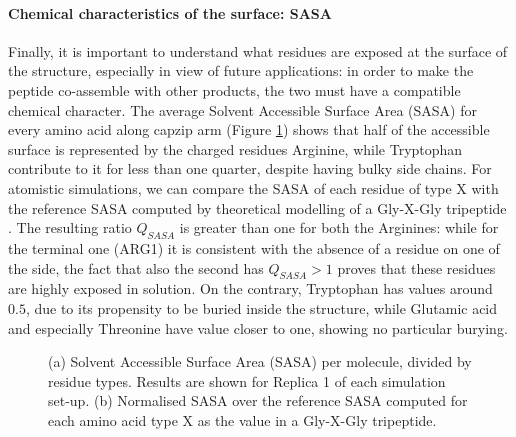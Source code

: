 \paragraph{Chemical characteristics of the surface: SASA} Finally, it is important to understand what residues are exposed at the surface of the structure, especially in view of future applications: in order to make the peptide co-assemble with other products, the two must have a compatible chemical character. The average Solvent Accessible Surface Area (SASA) for every amino acid along capzip arm (Figure \ref{fig:BTI_sasa_exposed}) shows that half of the accessible surface is represented by the charged residues Arginine, while Tryptophan contribute to it for less than one quarter, despite having bulky side chains.
%
For atomistic simulations, we can compare the SASA of each residue of type X with the reference SASA computed by theoretical modelling of a Gly-X-Gly tripeptide \citep{Tien2013}. The resulting ratio $Q_{SASA}$ is greater than one for both the Arginines: while for the terminal one (ARG1) it is consistent with the absence of a residue on one of the side, the fact that also the second has $Q_{SASA}>1$ proves that these residues are highly exposed in solution. On the contrary, Tryptophan has values around $0.5$, due to its propensity to be buried inside the structure, while Glutamic acid and especially Threonine have value closer to one, showing no particular burying.
\begin{figure}[t]
\centering
{} 
\caption[SASA per residue of a buckyball in solution]{(a) Solvent Accessible Surface Area (SASA) per molecule, divided by residue types. Results are shown for Replica 1 of each simulation set-up. (b) Normalised SASA over the reference SASA computed for each amino acid type X as the value in a Gly-X-Gly tripeptide.}
\label{fig:BTI_sasa_exposed}
\end{figure}


